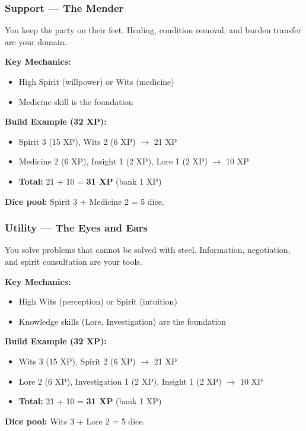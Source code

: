 \subsubsection{Support --- The Mender}

You keep the party on their feet. Healing, condition removal, and burden transfer are your domain.

\textbf{Key Mechanics:}
\begin{itemize}
  \item High Spirit (willpower) or Wits (medicine)
  \item Medicine skill is the foundation
\end{itemize}

\textbf{Build Example (32 XP):}
\begin{itemize}
  \item Spirit 3 (15 XP), Wits 2 (6 XP) $\rightarrow$ 21 XP
  \item Medicine 2 (6 XP), Insight 1 (2 XP), Lore 1 (2 XP) $\rightarrow$ 10 XP
  \item \textbf{Total:} 21 + 10 = \textbf{31 XP} (bank 1 XP)
\end{itemize}
\textbf{Dice pool:} Spirit 3 + Medicine 2 = 5 dice.

\subsubsection{Utility --- The Eyes and Ears}

You solve problems that cannot be solved with steel. Information, negotiation, and spirit consultation are your tools.

\textbf{Key Mechanics:}
\begin{itemize}
  \item High Wits (perception) or Spirit (intuition)
  \item Knowledge skills (Lore, Investigation) are the foundation
\end{itemize}

\textbf{Build Example (32 XP):}
\begin{itemize}
  \item Wits 3 (15 XP), Spirit 2 (6 XP) $\rightarrow$ 21 XP
  \item Lore 2 (6 XP), Investigation 1 (2 XP), Insight 1 (2 XP) $\rightarrow$ 10 XP
  \item \textbf{Total:} 21 + 10 = \textbf{31 XP} (bank 1 XP)
\end{itemize}
\textbf{Dice pool:} Wits 3 + Lore 2 = 5 dice.

